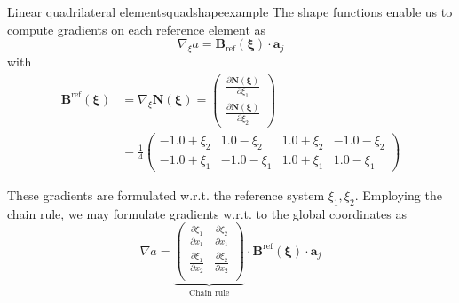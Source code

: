 \begin{example}{Linear quadrilateral elements}{quadshapeexample}
    The shape functions enable us to compute gradients on each reference element as 
    \begin{equation}
        \nabla_\xi a = \mathbf{B}_\textrm{ref}(\pmb{\xi}) \cdot  \mathbf{a}_j
    \end{equation}
    with 
    \begin{align}
        \mathbf{B}^\textrm{ref}(\pmb{\xi})
        & =  \nabla_\xi \mathbf{N}(\pmb{\xi}) = 
        \begin{pmatrix}
            \frac{\partial \mathbf{N}(\pmb{\xi})}{\partial \xi_1} \\ 
            \frac{\partial \mathbf{N}(\pmb{\xi})}{\partial \xi_2} 
        \end{pmatrix} \\
        & = \frac{1}{4}
        \begin{pmatrix}
            -1.0 + \xi_2 & 1.0 - \xi_2 & 1.0 + \xi_2 & -1.0 - \xi_2 \\
            -1.0 + \xi_1 & -1.0 - \xi_1 & 1.0 + \xi_1 & 1.0 - \xi_1
        \end{pmatrix}
    \end{align}

    These gradients are formulated w.r.t. the reference system $\xi_1, \xi_2$. Employing the chain rule, we may formulate gradients w.r.t. to the global coordinates as 
    \begin{equation}
        \nabla a = 
        \underbrace{
        \begin{pmatrix}
            \frac{\partial \xi_1}{\partial x_1} & \frac{\partial \xi_2}{\partial x_1} \\
            \frac{\partial \xi_1}{\partial x_2} & \frac{\partial \xi_2}{\partial x_2} \\
        \end{pmatrix}
        }_\textrm{Chain rule}
        \cdot 
        \mathbf{B}^\textrm{ref}(\pmb{\xi}) \cdot  \mathbf{a}_j
    \end{equation}


\end{example}
